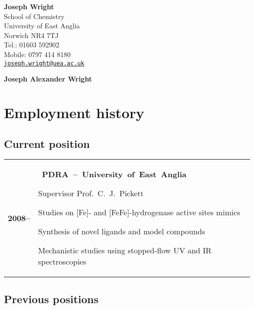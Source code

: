 \documentclass[11pt,draft]{article}
\makeatletter
\newlength\sidewidth
\newlength\mainwidth
\newcommand*\headline[1]{%
  \hbox{%
    \llap{\ding{72}\hspace*{0.2 em}}%
    \textbf{#1}%
  }%
}
\newenvironment{CVtable}
  {%
    \begin{tabular}
      {@{}>{\bfseries}p{\sidewidth}@{}>{\RaggedRight}p{\mainwidth}@{}}%
  }
  {\end{tabular}}
\makeatother
\begin{document}
\begin{raggedleft}
  \textbf{Joseph Wright}    \\
  School of Chemistry       \\
  University of East Anglia \\
  Norwich NR4 7TJ           \\
  Tel.: 01603 592902        \\
  Mobile: 0797 414 8180     \\
  \href{mailto:joseph.wright@uea.ac.uk}
    {\texttt{joseph.wright@uea.ac.uk}} \\
\end{raggedleft}

\begin{center}
  \Huge\bfseries\sffamily
  Joseph Alexander Wright
\end{center}

\section{Employment history}

\subsection{Current position}
\nocite{*}

\begin{CVtable}
  2008-- &
    \headline{PDRA -- University of East Anglia} \par
    Supervisor Prof.~C.~J.~Pickett \par
    Studies on [Fe]- and [FeFe]-hydrogenase active sites mimics \par
    Synthesis of novel ligands and model compounds \par
    Mechanistic studies using stopped-flow UV and IR spectroscopies
  \\
\end{CVtable}

\subsection{Previous positions}
\end{document}
